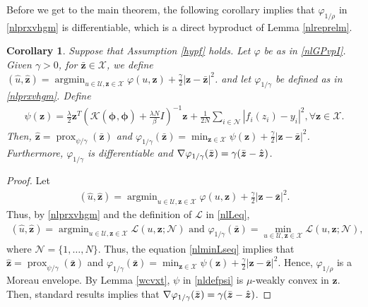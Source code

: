 \documentclass[10pt,reqno]{amsart}
\newcommand{\argmin}{\operatorname{argmin}}
\newcommand{\1}{{\chi}}
\numberwithin{equation}{section}
\theoremstyle{thmlemcorr}
\numberwithin{theorem}{section}
\newtheorem{corollary}[theorem]{Corollary}
\theoremstyle{thmlemcorr*}
\theoremstyle{defi}
\theoremstyle{remexample}
\theoremstyle{ass}
\begin{document}
Before we get to the main theorem, the following corollary implies that  $\varphi_{1/\rho}$  in \eqref{nlprxvhgm} is differentiable, which is a direct byproduct of 
Lemma \ref{nlreprelm}.  
\begin{corollary}
	\label{nlproxmp}
	Suppose that Assumption \ref{hypf} holds. Let $\varphi$ be as in \eqref{nlGPvpI}.  Given $\gamma>0$, for $\bar{\boldsymbol{z}}\in \mathcal{X}$, we define
		$(\hat{u}, \hat{\boldsymbol{z}}) = \argmin_{u\in \mathcal{U}, \boldsymbol{z}\in \mathcal{X}}\varphi(u, \boldsymbol{z}) + \frac{\gamma}{2}|\boldsymbol{z} - \bar{\boldsymbol{z}}|^2$. 
	and let $\varphi_{1/\gamma}$ be defined as in \eqref{nlprxvhgm}. 
	Define
	\begin{align}
		\label{nldefpsi}
		\psi({\boldsymbol{z}}) = \frac{\lambda}{2}\boldsymbol{z}^T_{}(\mathcal{K}(\boldsymbol{\phi}_{}, \boldsymbol{\phi}) + \frac{\lambda N}{\beta}I)^{-1}\boldsymbol{z}_{}+ \frac{1}{2N}\sum_{i\in \mathcal{N}}|f_i(z_i) - y_i|^2, \forall \boldsymbol{z}\in \mathcal{X}. 
	\end{align}
	Then,   
	$\hat{\boldsymbol{z}}=\operatorname{prox}_{\psi/\gamma}(\bar{\boldsymbol{z}})$
	and 
		$\varphi_{1/\gamma}(\bar{\boldsymbol{z}}) = \min_{\boldsymbol{z}\in \mathcal{X}}\psi(\boldsymbol{z}) + \frac{\gamma}{2}|\boldsymbol{z} - \bar{\boldsymbol{z}}|^2$. 
	Furthermore, $\varphi_{1/\gamma}$ is differentiable and 
		$\nabla \varphi_{1/\gamma}(\bar{\boldsymbol{z}})  = \gamma(\Bar{\boldsymbol{z}} - \hat{\boldsymbol{z}})$.
\end{corollary}
\begin{proof}
	Let
	\begin{align*}
		(\hat{u}, \hat{\boldsymbol{z}}) = \argmin_{u\in \mathcal{U}, \boldsymbol{z}\in \mathcal{X}}\varphi(u, \boldsymbol{z}) + \frac{\gamma}{2}|\boldsymbol{z} - \bar{\boldsymbol{z}}|^2.
	\end{align*}
	 Thus, by \eqref{nlprxvhgm} and the definition of $\mathcal{L}$ in \eqref{nlLeq},  
	 \begin{align*}
	 	(\hat{u}, \hat{\boldsymbol{z}}) = \argmin_{u\in \mathcal{U}, \boldsymbol{z}\in \mathcal{X}}\mathcal{L}(u, \boldsymbol{z}; \mathcal{N}) \text{ and }  \varphi_{1/\gamma}(\bar{\boldsymbol{z}}) = \min _{u\in \mathcal{U}, \boldsymbol{z}\in \mathcal{X}}\mathcal{L}(u, \boldsymbol{z}; \mathcal{N}),
	 \end{align*}
	 where $\mathcal{N}=\{1,\dots, N\}$. 
	Thus, the equation \eqref{nlminLseq} implies that $\hat{\boldsymbol{z}}=\operatorname{prox}_{\psi/\gamma}(\bar{\boldsymbol{z}})$
	and 
	$\varphi_{1/\gamma}(\bar{\boldsymbol{z}}) = \min_{\boldsymbol{z}\in \mathcal{X}}\psi(\boldsymbol{z}) + \frac{\gamma}{2}|\boldsymbol{z} - \bar{\boldsymbol{z}}|^2$.  Hence, $\varphi_{1/\rho}$ is a Moreau envelope. By Lemma \ref{wcvxt},  $\psi$ in \eqref{nldefpsi} is $\mu$-weakly convex in $\boldsymbol{z}$. Then, standard results  \cite{rockafellar1970convex} implies that $\nabla \varphi_{1/\gamma}(\bar{\boldsymbol{z}})  = \gamma(\Bar{\boldsymbol{z}} - \hat{\boldsymbol{z}})$. 
\end{proof}
\end{document}

